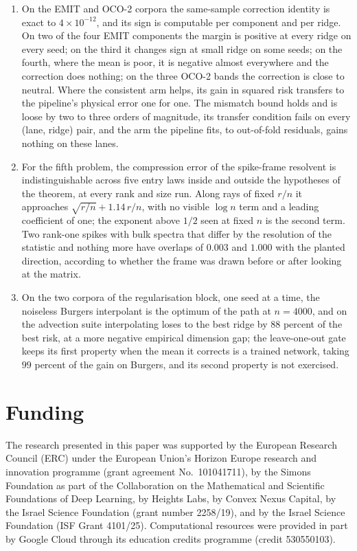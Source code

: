\documentclass[11pt]{article}
\theoremstyle{definition}
\newcommand{\numGateCaptured}{99}
\newcommand{\numIdentWorst}{4\times10^{-12}}
\newcommand{\numRayC}{1.14}
\begin{document}
\begin{enumerate}
dependence on the augmentation strength, no dependence on the column normalization, and nothing that
one doubling of $d$ can say about the limit; the residual coefficients that argument needs have a
one-line Hermite identification with nonnegativity built in (Proposition~\ref{prop:hermite}).
\item On the EMIT and OCO-2 corpora the same-sample correction identity is exact to
$\numIdentWorst$, and its sign is computable per component and per ridge. On two of the four EMIT
components the margin is positive at every ridge on every seed; on the third it changes sign at
small ridge on some seeds; on the fourth, where the mean is poor, it is negative almost everywhere
and the correction does nothing; on the three OCO-2 bands the correction is close to neutral. Where
the consistent arm helps, its gain in squared risk transfers to the pipeline's physical error one for
one. The mismatch bound holds and is loose by two to three orders of magnitude, its transfer
condition fails on every (lane, ridge) pair, and the arm the pipeline fits, to out-of-fold
residuals, gains nothing on these lanes.
\item For the fifth problem, the compression error of the spike-frame resolvent is indistinguishable
across five entry laws inside and outside the hypotheses of the theorem, at every rank and size run.
Along rays of fixed $r/n$ it approaches $\sqrt{r/n}+\numRayC\,r/n$, with no visible $\log n$ term
and a leading coefficient of one; the exponent above $1/2$ seen at fixed $n$ is the second term.
Two rank-one spikes with bulk spectra that differ by the resolution of the statistic and nothing
more have overlaps of $0.003$ and $1.000$ with the planted direction, according to whether the frame
was drawn before or after looking at the matrix.
\item On the two corpora of the regularisation block, one seed at a time, the noiseless Burgers
interpolant is the optimum of the path at $n=4000$, and on the advection suite interpolating loses to
the best ridge by $88$ percent of the best risk, at a more negative empirical dimension gap; the
leave-one-out gate keeps its first property when the mean it corrects is a trained network, taking
$\numGateCaptured$ percent of the gain on Burgers, and its second property is not exercised.
\end{enumerate}

\section*{Funding}
The research presented in this paper was supported by the European Research Council (ERC) under the
European Union's Horizon Europe research and innovation programme (grant agreement No.~101041711), by
the Simons Foundation as part of the Collaboration on the Mathematical and Scientific Foundations of
Deep Learning, by Heights Labs, by Convex Nexus Capital, by the Israel Science Foundation (grant
number 2258/19), and by the Israel Science Foundation (ISF Grant 4101/25). Computational resources were provided in part by Google Cloud through its education credits programme (credit 530550103).
\end{document}
